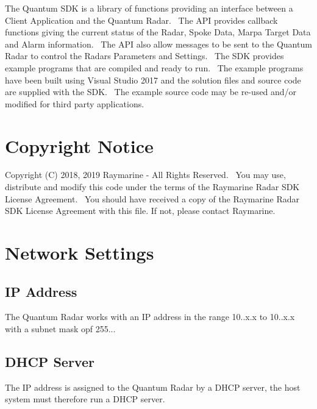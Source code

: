 The Quantum S\+DK is a library of functions providing an interface between a Client Application and the Quantum Radar.~\newline
 The A\+PI provides callback functions giving the current status of the Radar, Spoke Data, Marpa Target Data and Alarm information.~\newline
The A\+PI also allow messages to be sent to the Quantum Radar to control the Radars Parameters and Settings.~\newline
 The S\+DK provides example programs that are compiled and ready to run.~\newline
The example programs have been built using Visual Studio 2017 and the solution files and source code are supplied with the S\+DK.~\newline
The example source code may be re-\/used and/or modified for third party applications.~\newline
\hypertarget{index_Copyright}{}\section{Copyright Notice}\label{index_Copyright}
Copyright (C) 2018, 2019 Raymarine -\/ All Rights Reserved.~\newline
You may use, distribute and modify this code under the terms of the Raymarine Radar S\+DK License Agreement.~\newline
You should have received a copy of the Raymarine Radar S\+DK License Agreement with this file. If not, please contact Raymarine.~\newline
\hypertarget{index_Network}{}\section{Network Settings}\label{index_Network}
\hypertarget{index_Address}{}\subsection{I\+P Address}\label{index_Address}
The Quantum Radar works with an IP address in the range 10..\+x.\+x to 10..\+x.\+x with a subnet mask opf 255... ~\newline
\hypertarget{index_Server}{}\subsection{D\+H\+C\+P Server}\label{index_Server}
The IP address is assigned to the Quantum Radar by a D\+H\+CP server, the host system must therefore run a D\+H\+CP server.~\newline
